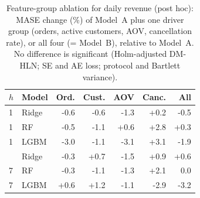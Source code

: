 \begin{table}[t]
\centering
\setlength{\tabcolsep}{4pt}
\caption{Feature-group ablation for daily revenue (post hoc): MASE change (\%) of Model~A plus one driver group (orders, active customers, AOV, cancellation rate), or all four (= Model~B), relative to Model~A. No difference is significant (Holm-adjusted DM-HLN; SE and AE loss; protocol and Bartlett variance).}
\label{tab:abl}
\begin{tabular}{llrrrrr}
\toprule
$h$ & Model & Ord. & Cust. & AOV & Canc. & All \\
\midrule
1 & Ridge & -0.6 & -0.6 & -1.3 & +0.2 & -0.5 \\
1 & RF & -0.5 & -1.1 & +0.6 & +2.8 & +0.3 \\
1 & LGBM & -3.0 & -1.1 & -3.1 & +3.1 & -1.9 \\
\addlinespace
7 & Ridge & -0.3 & +0.7 & -1.5 & +0.9 & +0.6 \\
7 & RF & -0.3 & -1.1 & -1.3 & +2.1 & 0.0 \\
7 & LGBM & +0.6 & +1.2 & -1.1 & -2.9 & -3.2 \\
\bottomrule
\end{tabular}
\end{table}
